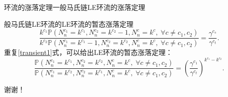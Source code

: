 \documentclass{beamer}
\newcommand{\Pnum}{\mathbb{P}}
\begin{document}
\begin{frame}{环流的涨落定理}{一般马氏链LE环流的涨落定理}
	\begin{block}{般马氏链LE环流的LE环流的暂态涨落定理}
		\begin{equation}\label{transient1}
			\frac{k^{c_1} \Pnum(N^{c_1}_n=k^{c_1},N^{c_2}_n=k^{c_2}-1,N^{c}_n=k^{c},\;\forall c\neq c_1,c_2)}
			{k^{c_2} \Pnum(N^{c_1}_n=k^{c_1} -1,N^{c_2}_n=k^{c_2},N^{c}_n=k^{c},\;\forall c\neq c_1,c_2)}
			= \frac{\gamma^{c_s}}{\gamma^{c_t}}.
		\end{equation}
		重复\ref{transient1}式，可以给出LE环流的暂态涨落定理：
		\begin{equation}\label{transient2}
			\frac{\Pnum(N^{c_1}_n=k^{c_1},N^{c_2}_n=k^{c_2},N^{c}_n=k^{c},\;\forall c\neq c_1,c_2)}
			{\Pnum(N^{c_1}_n=k^{c_2},N^{c_2}_n=k^{c_1},N^{c}_n=k^{c},\;\forall c\neq c_1,c_2)}
			= \left(\frac{\gamma^{c_1}}{\gamma^{c_t}}\right)^{k^{c_1}-k^{c_2}}.
		\end{equation}
	\end{block}
\end{frame}


\begin{frame}
	\begin{center}
		\Huge 谢谢！
	\end{center}
\end{frame}
\end{document}
